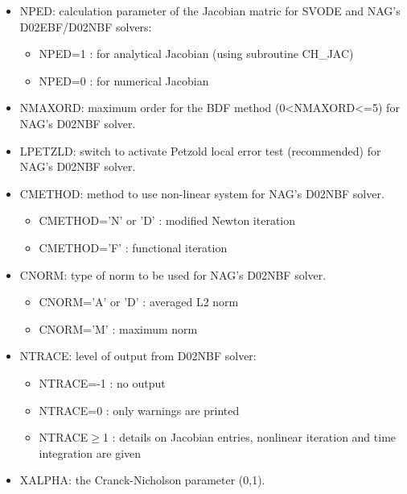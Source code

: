 \begin{itemize}
\item NPED: calculation parameter of the Jacobian matric for SVODE and NAG's D02EBF/D02NBF solvers:
\begin{itemize}
          \item NPED=1 : for analytical Jacobian (using subroutine CH\_JAC)
          \item NPED=0 : for numerical Jacobian
\end{itemize}

\item NMAXORD: maximum order for the BDF method (0<NMAXORD<=5) for NAG's D02NBF solver.

\item LPETZLD: switch to activate Petzold local error test (recommended) for NAG's D02NBF solver.

\item CMETHOD: method to use non-linear system for NAG's D02NBF solver.
\begin{itemize}
          \item CMETHOD='N' or 'D' : modified Newton iteration
          \item CMETHOD='F' : functional iteration
\end{itemize}

\item CNORM: type of norm to be used for NAG's D02NBF solver.
\begin{itemize}
          \item CNORM='A' or 'D' : averaged L2 norm
          \item CNORM='M' : maximum norm
\end{itemize}

\item NTRACE: level of output from D02NBF solver:
\begin{itemize}
          \item NTRACE=-1 : no output
          \item NTRACE=0 : only warnings are printed
          \item NTRACE$\ge$1 : details on Jacobian entries, nonlinear iteration and time integration are given 
\end{itemize}

\item XALPHA: the Cranck-Nicholson parameter (0,1).


\end{itemize}
